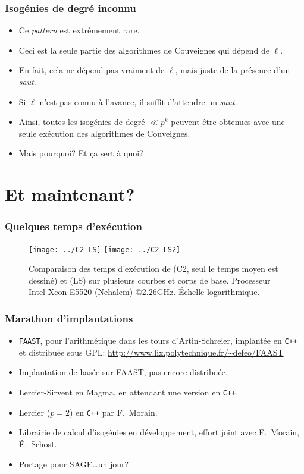 \documentclass[10pt]{beamer}
\newcommand{\0}{\mathcal{O}}  %
\begin{document}
\begin{frame}
  \frametitle{Isogénies de degré inconnu}
  
  \begin{itemize}
  \item Ce \emph{pattern} est extrêmement rare.
  \item Ceci est la seule partie des algorithmes de Couveignes qui dépend de $\ell$.
  \item<2-> \large En fait, cela ne dépend pas vraiment de $\ell$, mais juste de
    la présence d'un \emph{saut}.
  \item<2-> \large Si $\ell$ n'est pas connu à l'avance, il suffit d'attendre
    un \emph{saut}.
  \item<2-> \large Ainsi, toutes les isogénies de degré $\ll p^k$ peuvent être
    obtenues avec une seule exécution des algorithmes de Couveignes.
  \item<3-> \Large Mais pourquoi? Et ça sert à quoi?
  \end{itemize}  
\end{frame}


\section{Et maintenant?}

\begin{frame}
  \frametitle{Quelques temps d'exécution}

  \begin{figure}
  \centering
  \texttt{[image: ../C2-LS]}
   \texttt{[image: ../C2-LS2]}
   \caption{Comparaison des temps d'exécution de \cite{couveignes96}
     (C2, seul le temps moyen est dessiné) et \cite{lercier+sirvent08}
     (LS) sur plusieurs courbes et corps de base. Processeur Intel
     Xeon E5520 (Nehalem) @2.26GHz. Échelle logarithmique.}
  \label{fig:comp}
\end{figure}

\end{frame}


\begin{frame}
  \frametitle{Marathon d'implantations}

  \begin{itemize}
  \item \texttt{FAAST}, pour l'arithmétique dans les tours
    d'Artin-Schreier, implantée en \texttt{C++} et distribuée sous
    GPL: \url{http://www.lix.polytechnique.fr/~defeo/FAAST}
  \item Implantation de \cite{couveignes96} basée sur FAAST, pas encore distribuée.
  \item Lercier-Sirvent en Magma, en attendant une version en \texttt{C++}.
  \item Lercier ($p=2$) en \texttt{C++} par F.~Morain.
  \item Librairie de calcul d'isogénies en développement, effort joint
    avec F.~Morain, É.~Schost.
  \item Portage pour SAGE\dots un jour?
  \end{itemize}
\end{frame}
\end{document}
